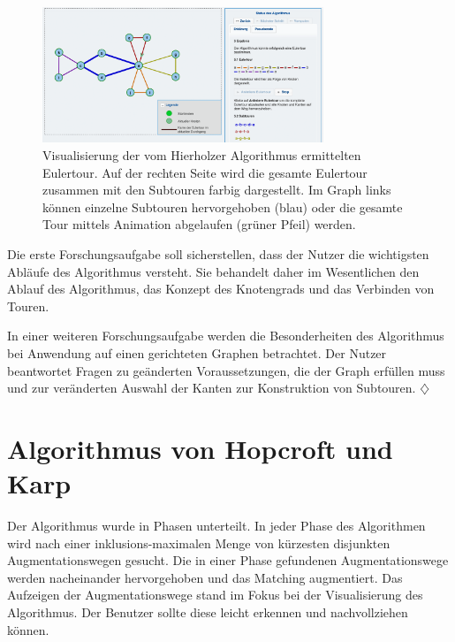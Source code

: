 \begin{figure}[h!]
	\centering
	\includegraphics[width=0.75\textwidth]{figures/hierholzer_animation}
	\caption[Hierholzer: Eulertour Animation]{Visualisierung der vom Hierholzer Algorithmus ermittelten Eulertour. Auf der rechten Seite wird die gesamte Eulertour zusammen mit den Subtouren farbig dargestellt. Im Graph links können einzelne Subtouren hervorgehoben (blau) oder die gesamte Tour mittels Animation abgelaufen (grüner Pfeil) werden.}\label{fig:hierholzer-animation}
\end{figure}

Die erste Forschungsaufgabe soll sicherstellen, dass der Nutzer die wichtigsten Abläufe des Algorithmus versteht. Sie behandelt daher im Wesentlichen den Ablauf des Algorithmus, das Konzept des Knotengrads und das Verbinden von Touren.

In einer weiteren Forschungsaufgabe werden die Besonderheiten des Algorithmus bei Anwendung auf einen gerichteten Graphen betrachtet. Der Nutzer beantwortet Fragen zu geänderten Voraussetzungen, die der Graph erfüllen muss und zur veränderten Auswahl der Kanten zur Konstruktion von Subtouren. \hfill$\diamondsuit$
     
\section{Algorithmus von Hopcroft und Karp} %

Der Algorithmus wurde in Phasen unterteilt. In jeder Phase des Algorithmen wird nach einer inklusions-maximalen Menge von kürzesten disjunkten Augmentationswegen gesucht. Die in einer Phase gefundenen Augmentationswege werden nacheinander hervorgehoben und das Matching augmentiert.
Das Aufzeigen der Augmentationswege stand im Fokus bei der Visualisierung des Algorithmus. Der Benutzer sollte diese leicht erkennen und nachvollziehen können. 

